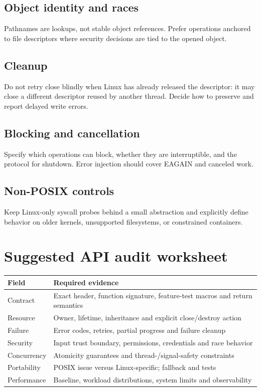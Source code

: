 \documentclass[11pt,letterpaper,oneside]{report}
\begin{document}
\section{Object identity and races}
Pathnames are lookups, not stable object references. Prefer operations anchored to file descriptors where security decisions are tied to the opened object.

\section{Cleanup}
Do not retry close blindly when Linux has already released the descriptor: it may close a different descriptor reused by another thread. Decide how to preserve and report delayed write errors.

\section{Blocking and cancellation}
Specify which operations can block, whether they are interruptible, and the protocol for shutdown. Error injection should cover EAGAIN and canceled work.

\section{Non-POSIX controls}
Keep Linux-only syscall probes behind a small abstraction and explicitly define behavior on older kernels, unsupported filesystems, or constrained containers.

\chapter{Suggested API audit worksheet}
\begin{longtable}{>{\raggedright\arraybackslash}p{.23\linewidth}>{\raggedright\arraybackslash}p{}}\toprule Field & Required evidence\\\midrule\endhead
Contract & Exact header, function signature, feature-test macros and return semantics\\
Resource & Owner, lifetime, inheritance and explicit close/destroy action\\
Failure & Error codes, retries, partial progress and failure cleanup\\
Security & Input trust boundary, permissions, credentials and race behavior\\
Concurrency & Atomicity guarantees and thread-/signal-safety constraints\\
Portability & POSIX issue versus Linux-specific; fallback and tests\\
Performance & Baseline, workload distributions, system limits and observability\\
\bottomrule\end{longtable}
\end{document}
